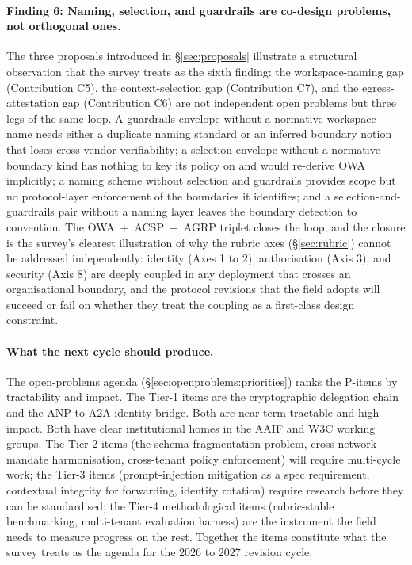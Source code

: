 \paragraph{Finding 6: Naming, selection, and guardrails
are co-design problems, not orthogonal ones.}
The three proposals introduced in \S\ref{sec:proposals}
illustrate a structural observation that the survey
treats as the sixth finding: the workspace-naming gap
(Contribution C5), the context-selection gap
(Contribution C7), and the egress-attestation gap
(Contribution C6) are not independent open problems but
three legs of the same loop. A guardrails envelope
without a normative workspace name needs either a
duplicate naming standard or an inferred boundary
notion that loses cross-vendor verifiability; a
selection envelope without a normative boundary kind
has nothing to key its policy on and would re-derive
OWA implicitly; a naming scheme without selection and
guardrails provides scope but no protocol-layer
enforcement of the boundaries it identifies; and a
selection-and-guardrails pair without a naming layer
leaves the boundary detection to convention. The
OWA~+~ACSP~+~AGRP triplet closes the loop, and the
closure is the survey's clearest illustration of why
the rubric axes (\S\ref{sec:rubric}) cannot be
addressed independently: identity (Axes 1 to 2),
authorisation (Axis 3), and security (Axis 8) are
deeply coupled in any deployment that crosses an
organisational boundary, and the protocol revisions
that the field adopts will succeed or fail on whether
they treat the coupling as a first-class design
constraint.

\paragraph{What the next cycle should produce.}
The open-problems agenda
(\S\ref{sec:openproblems:priorities}) ranks the
P-items by tractability and impact. The Tier-1
items are the cryptographic delegation chain and
the ANP-to-A2A identity bridge. Both are
near-term tractable and high-impact. Both have
clear institutional homes in the AAIF and W3C
working groups. The Tier-2 items (the schema
fragmentation problem, cross-network mandate
harmonisation, cross-tenant policy enforcement)
will require multi-cycle work; the Tier-3 items
(prompt-injection mitigation as a spec requirement,
contextual integrity for forwarding, identity
rotation) require research before they can be
standardised; the Tier-4 methodological items
(rubric-stable benchmarking, multi-tenant
evaluation harness) are the instrument the field
needs to measure progress on the rest. Together
the items constitute what the survey treats as
the agenda for the 2026 to 2027 revision cycle.

